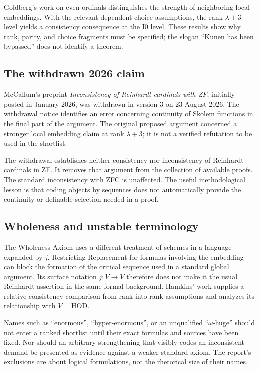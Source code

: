 \documentclass[11pt,letterpaper]{article}
\theoremstyle{definition}
\newcommand{\HOD}{\mathrm{HOD}}
\newcommand{\Izero}{\mathrm{I0}}
\begin{document}
Goldberg's work on even ordinals distinguishes the strength of neighboring local embeddings. With the relevant dependent-choice assumptions, the rank-$\lambda+3$ level yields a consistency consequence at the $\Izero$ level. These results show why rank, parity, and choice fragments must be specified; the slogan ``Kunen has been bypassed'' does not identify a theorem. \cite{goldberge}

\subsection{The withdrawn 2026 claim}

McCallum's preprint \emph{Inconsistency of Reinhardt cardinals with ZF}, initially posted in January 2026, was withdrawn in version 3 on 23 August 2026. The withdrawal notice identifies an error concerning continuity of Skolem functions in the final part of the argument. The original proposed argument concerned a stronger local embedding claim at rank $\lambda+3$; it is not a verified refutation to be used in the shortlist. \cite{mccallum}

The withdrawal establishes neither consistency nor inconsistency of Reinhardt cardinals in ZF. It removes that argument from the collection of available proofs. The standard inconsistency with ZFC is unaffected. The useful methodological lesson is that coding objects by sequences does not automatically provide the continuity or definable selection needed in a proof.

\subsection{Wholeness and unstable terminology}

The Wholeness Axiom uses a different treatment of schemes in a language expanded by $j$. Restricting Replacement for formulas involving the embedding can block the formation of the critical sequence used in a standard global argument. Its surface notation $j:V\to V$ therefore does not make it the usual Reinhardt assertion in the same formal background. Hamkins' work supplies a relative-consistency comparison from rank-into-rank assumptions and analyzes its relationship with $V=\HOD$. \cite{wholeness}

Names such as ``enormous'', ``hyper-enormous'', or an unqualified ``$\omega$-huge'' should not enter a ranked shortlist until their exact formulas and sources have been fixed. Nor should an arbitrary strengthening that visibly codes an inconsistent demand be presented as evidence against a weaker standard axiom. The report's exclusions are about logical formulations, not the rhetorical size of their names.
\end{document}
